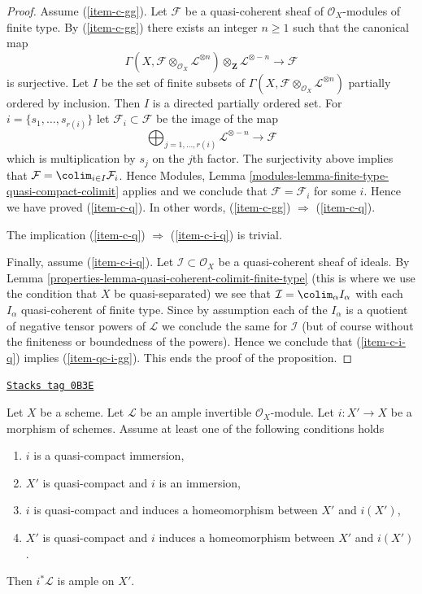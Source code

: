 \begin{proof}
\medskip\noindent
Assume (\ref{item-c-gg}). Let $\mathcal{F}$ be a quasi-coherent
sheaf of $\mathcal{O}_X$-modules of finite type.
By (\ref{item-c-gg}) there exists an integer $n \geq 1$ such that
the canonical map
$$
\Gamma(X, \mathcal{F} \otimes_{\mathcal{O}_X} \mathcal{L}^{\otimes n})
\otimes_{\mathbf{Z}} \mathcal{L}^{\otimes -n}
\longrightarrow
\mathcal{F}
$$
is surjective. Let $I$ be the set of finite subsets of
$\Gamma(X, \mathcal{F} \otimes_{\mathcal{O}_X} \mathcal{L}^{\otimes n})$
partially ordered by inclusion. Then $I$ is a directed partially ordered set.
For $i = \{s_1, \ldots, s_{r(i)}\}$ let $\mathcal{F}_i \subset \mathcal{F}$
be the image of the map
$$
\bigoplus\nolimits_{j = 1, \ldots, r(i)} \mathcal{L}^{\otimes -n}
\longrightarrow
\mathcal{F}
$$
which is multiplication by $s_j$ on the $j$th factor. The surjectivity above
implies that $\mathcal{F} = \colim_{i \in I} \mathcal{F}_i$.
Hence Modules, Lemma \ref{modules-lemma-finite-type-quasi-compact-colimit}
applies and we conclude that
$\mathcal{F} = \mathcal{F}_i$ for some $i$.
Hence we have proved (\ref{item-c-q}). In other words,
(\ref{item-c-gg}) $\Rightarrow$ (\ref{item-c-q}).

\medskip\noindent
The implication (\ref{item-c-q}) $\Rightarrow$ (\ref{item-c-i-q}) is trivial.

\medskip\noindent
Finally, assume (\ref{item-c-i-q}).
Let $\mathcal{I} \subset \mathcal{O}_X$ be a quasi-coherent sheaf
of ideals. By Lemma \ref{properties-lemma-quasi-coherent-colimit-finite-type}
(this is where we use the condition that $X$ be quasi-separated)
we see that $\mathcal{I} = \colim_\alpha I_\alpha$ with
each $I_\alpha$ quasi-coherent of finite type. Since by assumption each of
the $I_\alpha$ is a quotient of negative tensor powers of
$\mathcal{L}$ we conclude the same for $\mathcal{I}$ (but of course
without the finiteness or boundedness of the powers). Hence
we conclude that (\ref{item-c-i-q}) implies (\ref{item-qc-i-gg}).
This ends the proof of the proposition.
\end{proof}

\begin{lemma}
\label{properties-lemma-ample-on-locally-closed}
\href{https://stacks.math.columbia.edu/tag/0B3E}{\texttt{Stacks tag 0B3E}}

Let $X$ be a scheme. Let $\mathcal{L}$ be an ample invertible
$\mathcal{O}_X$-module. Let $i : X' \to X$ be a morphism of schemes.
Assume at least one of the following conditions holds
\begin{enumerate}
\item $i$ is a quasi-compact immersion,
\item $X'$ is quasi-compact and $i$ is an immersion,
\item $i$ is quasi-compact and induces a homeomorphism
between $X'$ and $i(X')$,
\item $X'$ is quasi-compact and $i$ induces a homeomorphism
between $X'$ and $i(X')$.
\end{enumerate}
Then $i^*\mathcal{L}$ is ample on $X'$.
\end{lemma}

